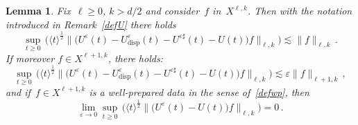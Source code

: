 \documentclass[11pt]{article}
\newtheorem{lemm}[theo]{Lemma}
\theoremstyle{definition}
\numberwithin{equation}{section}
\numberwithin{figure}{section}
\numberwithin{table}{section}
\newcommand*\eps{{\varepsilon}}
\DeclareMathOperator{\disp}{disp}
\begin{document}
\begin{lemm}\label{lem:UepstoU0}
Fix~$\ell \ge0$, ${k>d/2}$ and consider~{$f$ in~$X^{\ell,k}$}. Then with the notation introduced in Remark~\ref{defU} there holds
\begin{equation}\label{boundUeps-U0ip}
\sup_{t \ge 0} \, \bigg(\langle t \rangle^{\frac12} \big\| \big(U^\eps (t) - U^\eps_{\disp}(t) - U^{\eps \sharp}(t)- U (t)\big) {f} \big \|_{\ell,k}\bigg) \lesssim \|f\|_{\ell,k} \,.
\end{equation}
If moreover $f \in X^{\ell+1,k}$, there holds:
\begin{equation}\label{estimatesmoothdata}
\sup_{t \ge 0} \, \bigg(\langle t \rangle^{\frac12} \big\| \big(U^\eps (t) - U^\eps_{\disp}(t) - U^{\eps \sharp}(t)- U (t)\big) {f} \big \|_{\ell,k}\bigg) \lesssim \eps \|f\|_{\ell+1,k} \,,
\end{equation}
and if~{$f \in X^{\ell+1,k}$} is a well-prepared data in the sense of~\eqref{defwp}, then
\begin{equation}\label{boundUeps-U0}
\lim_{\eps\to0}\sup_{t \ge 0} \, \bigg(\langle t \rangle^{\frac12} \big \| \big(U^\eps (t) - U (t)\big) {f} \big\|_{{\ell,k}} \bigg)= 0\,.
\end{equation}
\end{lemm}
\end{document}
